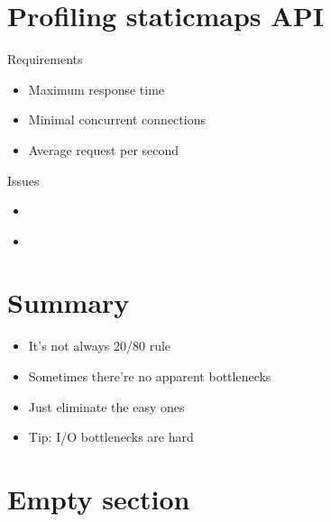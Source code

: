 \documentclass[16pt]{beamer}
\begin{document}
\section{Profiling staticmaps API}

\begin{frame}{Requirements}
  \begin{itemize}
  \item Maximum response time
  \item Minimal concurrent connections
  \item Average request per second
  \end{itemize}
\end{frame}

\begin{frame}{Issues}
  \begin{itemize}
  \item
  \end{itemize}
\end{frame}

\begin{frame}{}
  \begin{itemize}
  \item
  \end{itemize}
\end{frame}

\section*{Summary}

\begin{frame}{}
  \begin{itemize}
  \item It's not always 20/80 rule
  \item Sometimes there're no apparent bottlenecks
  \item Just eliminate the easy ones
  \item Tip: I/O bottlenecks are hard
  \end{itemize}
\end{frame}

\section{Empty section}
\end{document}
